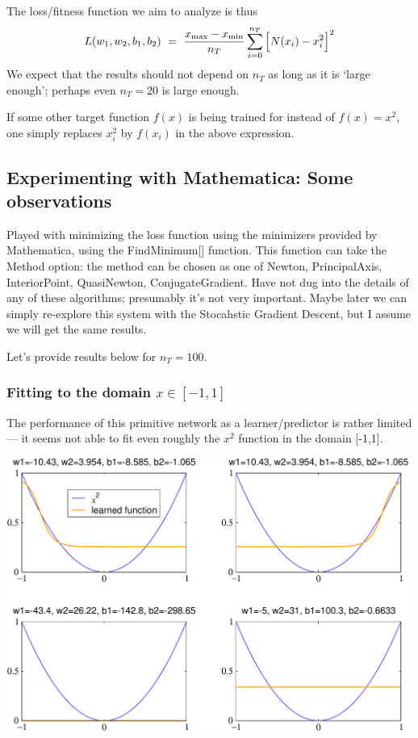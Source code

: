 \documentclass[12pt,a4paper]{article}
\begin{document}
The loss/fitness function we aim to analyze is thus 
\begin{equation}
L(w_1,w_2,b_1,b_2) ~=~  \frac{x_{\rm max} - x_{\rm min}}{n_T} \sum_{i=0}^{n_T} \Big[ N(x_i) -x_i^2 \Big]^2 
\end{equation}
%
We expect that the results should not depend on $n_T$ as long as it is `large enough'; perhaps
even $n_T=20$ is large enough. 

If some other target function $f(x)$ is being trained for instead of $f(x)=x^2$, one simply replaces
$x_i^2$ by $f(x_i)$ in the above expression.  


\subsection{Experimenting with Mathematica: Some observations}

Played with minimizing the loss function using the minimizers provided by Mathematica, using the 
FindMinimum[] function.  This function can take the Method option: the method can be chosen as one
of Newton, PrincipalAxis, InteriorPoint, QuasiNewton, ConjugateGradient.  Have not dug into the
details of any of these algorithms; presumably it's not very important.  Maybe later we can simply
re-explore this system with the Stocahstic Gradient Descent, but I assume we will get the same
results.  

Let's provide results below for $n_T=100$.  


\subsubsection{Fitting to the domain $x\in[-1,1]$}

The performance of this primitive network as a learner/predictor is rather limited --- it seems not
able to fit even roughly the $x^2$ function in the domain [-1,1].  

\smallskip

\begin{center}
\includegraphics[width=0.99\textwidth]{Images/3node_largedomain_learnedfunctions_a_01}
\end{center}
\end{document}
